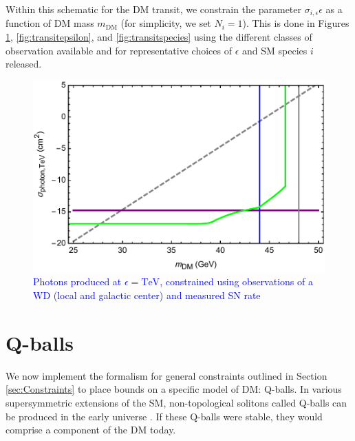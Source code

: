 \documentclass[twocolumn,showpacs,preprintnumbers,amsmath,amssymb,prd]{revtex4}
\begin{document}
Within this schematic for the DM transit, we constrain the parameter $\sigma_{i,\epsilon} \epsilon$ as a function of DM mass $m_\text{DM}$ (for simplicity, we set $N_i = 1$).
This is done in Figures \ref{fig:transitclasses}, \ref{fig:transitepsilon}, and \ref{fig:transitspecies} using the different classes of observation available and for representative choices of $\epsilon$ and SM species $i$ released.

\begin{figure}
\includegraphics[scale=.45]{transitobservation.pdf}
\caption{\textcolor{blue}{Photons produced at $\epsilon = \text{TeV}$, constrained using observations of a WD (local and galactic center) and measured SN rate}}
\label{fig:transitclasses}
\end{figure}

\section{Q-balls}
\label{sec:QBalls}

We now implement the formalism for general constraints outlined in Section \ref{sec:Constraints} to place bounds on a specific model of DM: Q-balls.
In various supersymmetric extensions of the SM, non-topological solitons called Q-balls can be produced in the early universe \cite{Coleman:1985ki, Kusenko:1997si}.
If these Q-balls were stable, they would comprise a component of the DM today.
\end{document}

